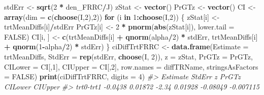 \documentclass[
]{book}
\newenvironment{Shaded}{\begin{snugshade}}{\end{snugshade}}
\newcommand{\CommentTok}[1]{\textcolor[rgb]{0.56,0.35,0.01}{\textit{#1}}}
\newcommand{\ControlFlowTok}[1]{\textcolor[rgb]{0.13,0.29,0.53}{\textbf{#1}}}
\newcommand{\DataTypeTok}[1]{\textcolor[rgb]{0.13,0.29,0.53}{#1}}
\newcommand{\DecValTok}[1]{\textcolor[rgb]{0.00,0.00,0.81}{#1}}
\newcommand{\KeywordTok}[1]{\textcolor[rgb]{0.13,0.29,0.53}{\textbf{#1}}}
\newcommand{\NormalTok}[1]{#1}
\newcommand{\OperatorTok}[1]{\textcolor[rgb]{0.81,0.36,0.00}{\textbf{#1}}}
\newcommand{\OtherTok}[1]{\textcolor[rgb]{0.56,0.35,0.01}{#1}}
\newcommand{\StringTok}[1]{\textcolor[rgb]{0.31,0.60,0.02}{#1}}
\begin{document}
\begin{Shaded}
\begin{Highlighting}[]
\NormalTok{stdErr <-}\StringTok{ }\KeywordTok{sqrt}\NormalTok{(}\DecValTok{2} \OperatorTok{*}\StringTok{ }\NormalTok{den_FRRC}\OperatorTok{/}\NormalTok{J)}
\NormalTok{zStat <-}\StringTok{ }\KeywordTok{vector}\NormalTok{()}
\NormalTok{PrGTz <-}\StringTok{ }\KeywordTok{vector}\NormalTok{()}
\NormalTok{CI <-}\StringTok{ }\KeywordTok{array}\NormalTok{(}\DataTypeTok{dim =} \KeywordTok{c}\NormalTok{(}\KeywordTok{choose}\NormalTok{(I,}\DecValTok{2}\NormalTok{),}\DecValTok{2}\NormalTok{))}
\ControlFlowTok{for}\NormalTok{ (i }\ControlFlowTok{in} \DecValTok{1}\OperatorTok{:}\KeywordTok{choose}\NormalTok{(I,}\DecValTok{2}\NormalTok{)) \{}
\NormalTok{  zStat[i] <-}\StringTok{ }\NormalTok{trtMeanDiffs[i]}\OperatorTok{/}\NormalTok{stdErr}
\NormalTok{  PrGTz[i] <-}\StringTok{ }\DecValTok{2} \OperatorTok{*}\StringTok{ }\KeywordTok{pnorm}\NormalTok{(}\KeywordTok{abs}\NormalTok{(zStat[i]), }\DataTypeTok{lower.tail =} \OtherTok{FALSE}\NormalTok{)}
\NormalTok{  CI[i, ] <-}\StringTok{ }\KeywordTok{c}\NormalTok{(trtMeanDiffs[i] }\OperatorTok{+}\StringTok{ }\KeywordTok{qnorm}\NormalTok{(alpha}\OperatorTok{/}\DecValTok{2}\NormalTok{) }\OperatorTok{*}\StringTok{ }\NormalTok{stdErr, }
\NormalTok{               trtMeanDiffs[i] }\OperatorTok{+}\StringTok{ }\KeywordTok{qnorm}\NormalTok{(}\DecValTok{1}\OperatorTok{-}\NormalTok{alpha}\OperatorTok{/}\DecValTok{2}\NormalTok{) }\OperatorTok{*}\StringTok{ }\NormalTok{stdErr)}
\NormalTok{\}}
\NormalTok{ciDiffTrtFRRC <-}\StringTok{ }\KeywordTok{data.frame}\NormalTok{(}\DataTypeTok{Estimate =}\NormalTok{ trtMeanDiffs, }
                            \DataTypeTok{StdErr =} \KeywordTok{rep}\NormalTok{(stdErr, }\KeywordTok{choose}\NormalTok{(I, }\DecValTok{2}\NormalTok{)),}
                            \DataTypeTok{z =}\NormalTok{ zStat, }
                            \DataTypeTok{PrGTz =}\NormalTok{ PrGTz, }
                            \DataTypeTok{CILower =}\NormalTok{ CI[,}\DecValTok{1}\NormalTok{],}
                            \DataTypeTok{CIUpper =}\NormalTok{ CI[,}\DecValTok{2}\NormalTok{], }
                            \DataTypeTok{row.names =}\NormalTok{ diffTRName,}
                            \DataTypeTok{stringsAsFactors =} \OtherTok{FALSE}\NormalTok{)}
\KeywordTok{print}\NormalTok{(ciDiffTrtFRRC, }\DataTypeTok{digits =} \DecValTok{4}\NormalTok{)}
\CommentTok{#>           Estimate  StdErr     z   PrGTz  CILower   CIUpper}
\CommentTok{#> trt0-trt1  -0.0438 0.01872 -2.34 0.01928 -0.08049 -0.007115}
\end{Highlighting}
\end{Shaded}
\end{document}
